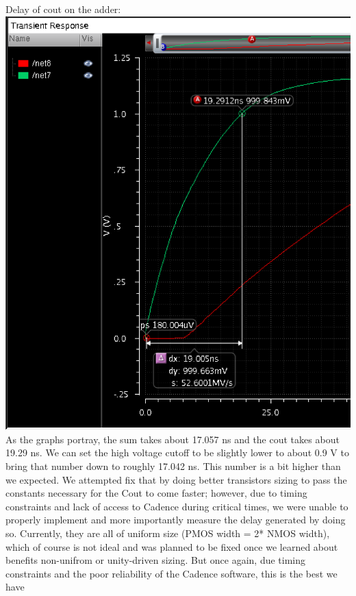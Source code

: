 \documentclass[12pt]{article}
\begin{document}
  \newline \newline
  Delay of cout on the adder:
  \newline
  \includegraphics[scale=0.4]{delaycout.png} \\
  \newline \newline
  As the graphs portray, the sum takes about 17.057 ns and the cout takes about 19.29 ns. We can 
  set the high voltage cutoff to be slightly lower to about 0.9 V to bring that number down to roughly
  17.042 ns. This number is a bit higher than we expected. We attempted fix that by doing better transistors sizing to 
  pass the constants necessary for the Cout to come faster; however, due to timing constraints and lack of access
  to Cadence during critical times, we were unable to properly implement and more importantly measure the delay
  generated by doing so. Currently, they are all of uniform size (PMOS width = 2* NMOS width), which of course 
  is not ideal and was planned to be fixed once we learned about benefits non-unifrom or unity-driven sizing. But 
  once again, due timing constraints and the poor reliability of the Cadence software, this is the best we have 
\end{document}
